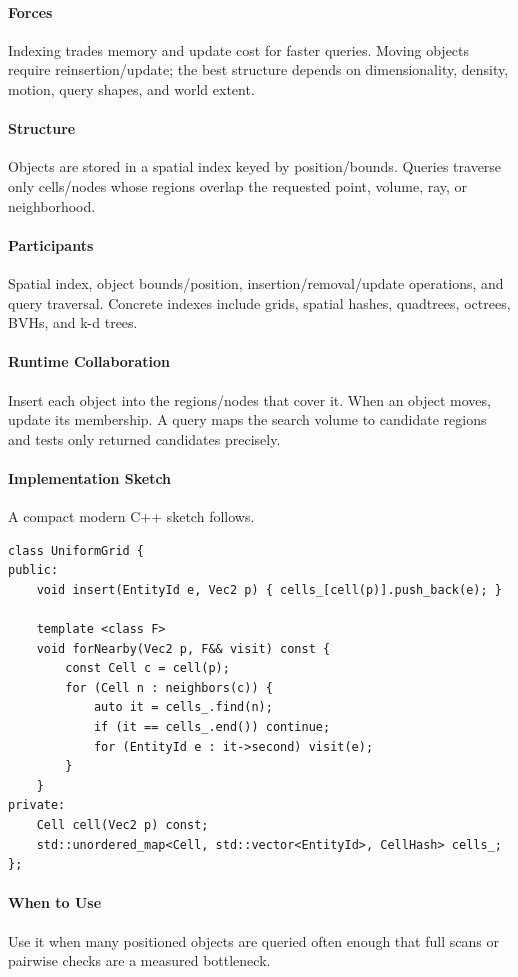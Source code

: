 \documentclass[11pt]{article}
\begin{document}
\paragraph{Forces} Indexing trades memory and update cost for faster queries. Moving objects require reinsertion/update; the best structure depends on dimensionality, density, motion, query shapes, and world extent.
\paragraph{Structure} Objects are stored in a spatial index keyed by position/bounds. Queries traverse only cells/nodes whose regions overlap the requested point, volume, ray, or neighborhood.
\paragraph{Participants} Spatial index, object bounds/position, insertion/removal/update operations, and query traversal. Concrete indexes include grids, spatial hashes, quadtrees, octrees, BVHs, and k-d trees.
\paragraph{Runtime Collaboration} Insert each object into the regions/nodes that cover it. When an object moves, update its membership. A query maps the search volume to candidate regions and tests only returned candidates precisely.
\paragraph{Implementation Sketch} A compact modern C++ sketch follows.
\begin{lstlisting}
class UniformGrid {
public:
    void insert(EntityId e, Vec2 p) { cells_[cell(p)].push_back(e); }

    template <class F>
    void forNearby(Vec2 p, F&& visit) const {
        const Cell c = cell(p);
        for (Cell n : neighbors(c)) {
            auto it = cells_.find(n);
            if (it == cells_.end()) continue;
            for (EntityId e : it->second) visit(e);
        }
    }
private:
    Cell cell(Vec2 p) const;
    std::unordered_map<Cell, std::vector<EntityId>, CellHash> cells_;
};
\end{lstlisting}
\paragraph{When to Use} Use it when many positioned objects are queried often enough that full scans or pairwise checks are a measured bottleneck.
\end{document}
